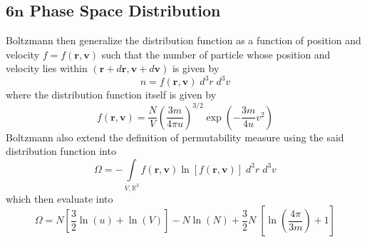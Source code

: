 \documentclass[../../../Main.tex]{subfiles}
\begin{document}
\subsection*{6$\boldsymbol{n}$ Phase Space Distribution}
Boltzmann then generalize the distribution function as a function of position and velocity $f=f(\mathbf{r},\mathbf{v})$ such that the number of particle whose position and velocity lies within  $(\mathbf{r}+d\mathbf{r},\mathbf{v}+d\mathbf{v})$ is given by 
\begin{equation*}
    n=f(\mathbf{r},\mathbf{v})\;d^3r\;d^3v
\end{equation*}
where the distribution function itself is given by
\begin{equation*}
    f(\mathbf{r},\mathbf{v})=\frac{N}{V} \left(\frac{3m}{4\pi u}\right)^{3/2}\exp\left(-\frac{3m}{4u}v^2\right)
\end{equation*}
Boltzmann also extend the definition of permutability measure using the said distribution function into
\begin{equation*}
    \Omega=-\int\limits_{V,\mathbb{R}^3} f(\mathbf{r},\mathbf{v})\ln [f(\mathbf{r},\mathbf{v})]\;d^3r\;d^3v
\end{equation*} 
which then evaluate into 
\begin{equation*}
    \Omega=N\left[\frac{3}{2}\ln (u)+\ln (V)\right]-N\ln (N)+\frac{3}{2}N\;\left[\ln\left(\frac{4\pi}{3m}\right)+1\right]
\end{equation*}
\end{document}
